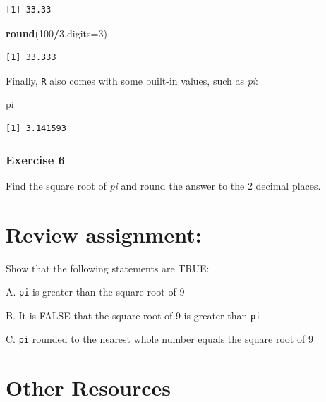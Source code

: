 \documentclass[
]{book}
\newenvironment{Shaded}{\begin{snugshade}}{\end{snugshade}}
\newcommand{\DataTypeTok}[1]{\textcolor[rgb]{0.13,0.29,0.53}{#1}}
\newcommand{\DecValTok}[1]{\textcolor[rgb]{0.00,0.00,0.81}{#1}}
\newcommand{\KeywordTok}[1]{\textcolor[rgb]{0.13,0.29,0.53}{\textbf{#1}}}
\newcommand{\NormalTok}[1]{#1}
\newcommand{\OperatorTok}[1]{\textcolor[rgb]{0.81,0.36,0.00}{\textbf{#1}}}
\begin{document}
\begin{verbatim}
[1] 33.33
\end{verbatim}

\begin{Shaded}
\begin{Highlighting}[]
\KeywordTok{round}\NormalTok{(}\DecValTok{100}\OperatorTok{/}\DecValTok{3}\NormalTok{,}\DataTypeTok{digits=}\DecValTok{3}\NormalTok{)}
\end{Highlighting}
\end{Shaded}

\begin{verbatim}
[1] 33.333
\end{verbatim}

Finally, \texttt{R} also comes with some built-in values, such as \emph{pi}:

\begin{Shaded}
\begin{Highlighting}[]
\NormalTok{pi}
\end{Highlighting}
\end{Shaded}

\begin{verbatim}
[1] 3.141593
\end{verbatim}

\hypertarget{exercise-6}{%
\subsubsection*{Exercise 6}\label{exercise-6}}

Find the square root of \emph{pi} and round the answer to the 2 decimal places.

\hypertarget{review-assignment}{%
\section*{Review assignment:}\label{review-assignment}}

Show that the following statements are TRUE:

A. \texttt{pi} is greater than the square root of 9

B. It is FALSE that the square root of 9 is greater than \texttt{pi}

C. \texttt{pi} rounded to the nearest whole number equals the square root of 9

\hypertarget{other-resources}{%
\section{Other Resources}\label{other-resources}}
\end{document}

